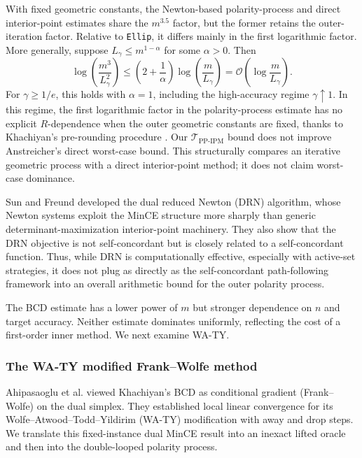 \documentclass[smallextended]{svjour3}
\begin{document}
With fixed geometric constants, the Newton-based polarity-process and direct
interior-point estimates share the $m^{3.5}$ factor, but the former retains the
outer-iteration factor. Relative to \texttt{Ellip}, it differs mainly in the
first logarithmic factor. More generally, suppose
$L_\gamma\leq m^{1-\alpha}$ for some $\alpha>0$.
Then
\[
    \log\!\left(\frac{m^3}{L_\gamma^2}\right)
    \leq\left(2+\frac1\alpha\right)\log\!\left(\frac{m}{L_\gamma}\right)
    =\mathcal O\!\left(\log\!\frac{m}{L_\gamma}\right).
\]
For $\gamma\geq1/e$, this holds with $\alpha=1$, including the high-accuracy
regime $\gamma\uparrow1$. In this regime, the first logarithmic factor in the
polarity-process estimate has no explicit $R$-dependence when the outer
geometric constants are fixed, thanks to Khachiyan's pre-rounding procedure
\cite{khachiyan1996rounding}. Our $\mathcal{T}_{\text{PP-IPM}}$ bound does not improve
Anstreicher's direct worst-case bound. This structurally compares an iterative
geometric process with a direct interior-point method; it does not claim
worst-case dominance.

Sun and Freund \cite{sunfreund2004mvce} developed the dual reduced Newton (DRN)
algorithm, whose Newton systems exploit the MinCE structure more sharply than
generic determinant-maximization interior-point machinery. They also show that
the DRN objective is not self-concordant but is closely related to a self-concordant function. Thus, while DRN is
computationally effective, especially with active-set strategies, it does not
plug as directly as the self-concordant path-following framework into an overall
arithmetic bound for the outer polarity process.

The BCD estimate has a lower power of $m$ but stronger dependence on $n$ and
target accuracy. Neither estimate dominates uniformly, reflecting the cost of a
first-order inner method. We next examine WA-TY.

\subsubsection{The WA-TY modified Frank--Wolfe method}\label{subsec: arith_waty}
Ahipasaoglu et al. \cite{ahipasaoglu2008fw} viewed Khachiyan's BCD as
conditional gradient (Frank--Wolfe) on the dual simplex. They established
local linear convergence for its Wolfe--Atwood--Todd--Yildirim (WA-TY)
modification with away and drop steps. We translate this fixed-instance dual
MinCE result into an inexact lifted oracle and then into the double-looped
polarity process.
\end{document}
